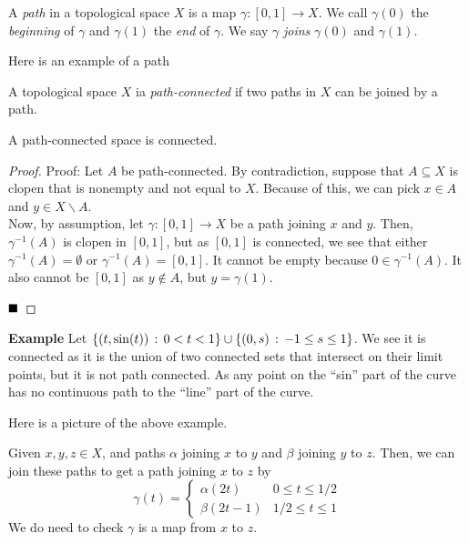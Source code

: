 
\begin{definition}
    A \emph{path} in a topological space $X$ is a map $\gamma : [0,1] \to X$. We call $\gamma(0)$ the \emph{beginning} of $\gamma$ and $\gamma(1)$ the \emph{end} of $\gamma$. We say $\gamma$ \emph{joins} $\gamma(0)$ and $\gamma(1)$. 
\end{definition}
Here is an example of a path

\begin{definition}
    A topological space $X$ ia \emph{path-connected} if two paths in $X$ can be joined by a path. 
\end{definition}

\begin{lemma}
    A path-connected space is connected.
\end{lemma}
\begin{proof}{Proof:}
    Let $A$ be path-connected. By contradiction, suppose that $A \subseteq X$ is clopen that is nonempty and not equal to $X$. Because of this, we can pick $x \in A$ and $y \in X \backslash A$.\\

    Now, by assumption, let $\gamma : [0, 1] \to X$ be a path joining $x$ and $y$. Then, $\gamma^{-1}(A)$ is clopen in $[0, 1]$, but as $[0, 1]$ is connected, we see that either $\gamma^{-1}(A) = \emptyset$ or $\gamma^{-1}(A) = [0, 1]$. It cannot be empty because $0 \in \gamma^{-1}(A)$. It also cannot be $[0, 1]$ as $y \notin A$, but $y = \gamma(1)$.  

    $\qed$
\end{proof}

\begin{example}{\textbf{Example}}
    Let $\{(t, \sin(t)) \, :\, 0 < t < 1\} \cup \{(0, s) \, :\, -1 \leq s \leq 1\}$. We see it is connected as it is the union of two connected sets that intersect on their limit points, but it is not path connected. As any point on the ``sin'' part of the curve has no continuous path to the ``line'' part of the curve.

    
\end{example}
Here is a picture of the above example.



Given $x, y, z \in X$, and paths $\alpha$ joining $x$ to $y$ and $\beta$ joining $y$ to $z$. Then, we can join these paths to get a path joining $x$ to $z$ by
\[ \gamma(t) = \left\{\begin{matrix} \alpha(2t) & 0 \leq t \leq 1/2 \\ \beta(2t - 1) & 1/2 \leq t \leq 1 \end{matrix}\right. \]
We do need to check $\gamma$ is a map from $x$ to $z$.\\


